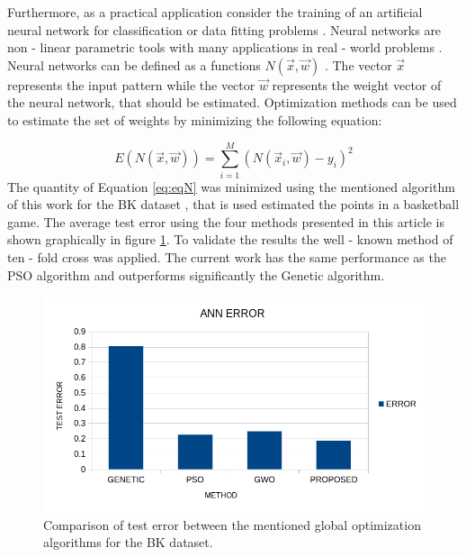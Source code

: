 \documentclass[journal,article,submit,pdftex,moreauthors]{Definitions/mdpi}
\begin{document}
Furthermore, as a practical application consider the training of an artificial neural network for classification or data fitting problems \cite{ann1,ann2}.  Neural networks are non - linear parametric tools with many applications in real - world problems \cite{ann_agri,ann_facial,ann_physics}.
Neural networks can be defined as a functions \textbf{$N(\overrightarrow{x},\overrightarrow{w})$
}. The vector $\overrightarrow{x}$ represents the input pattern
while the vector \textbf{$\overrightarrow{w}$ }represents  the weight vector of the neural network, that should be estimated.
Optimization methods can be used to estimate the set of weights by minimizing the following
equation:

\begin{equation}
E\left(N\left(\overrightarrow{x},\overrightarrow{w}\right)\right)=\sum_{i=1}^{M}\left(N\left(\overrightarrow{x}_{i},\overrightarrow{w}\right)-y_{i}\right)^{2}\label{eq:eqN}
\end{equation}
The quantity of Equation \ref{eq:eqN} was minimized using the mentioned algorithm of this work for the BK dataset \cite{bk_problem}, that is used  estimated the points  in a basketball game. The average test error using the four methods presented in this article is shown graphically in figure \ref{fig:mlpTest}. To validate the results the well - known method of ten - fold cross was applied. The current work has the same performance as the PSO algorithm and outperforms significantly the Genetic algorithm.
\begin{figure}[H]
\hspace{-5pt}\includegraphics[scale=0.5]{mlp_test.png}
\caption{Comparison of test error between the mentioned global optimization algorithms for the BK dataset. \label{fig:mlpTest}}
\end{figure}
\end{document}
